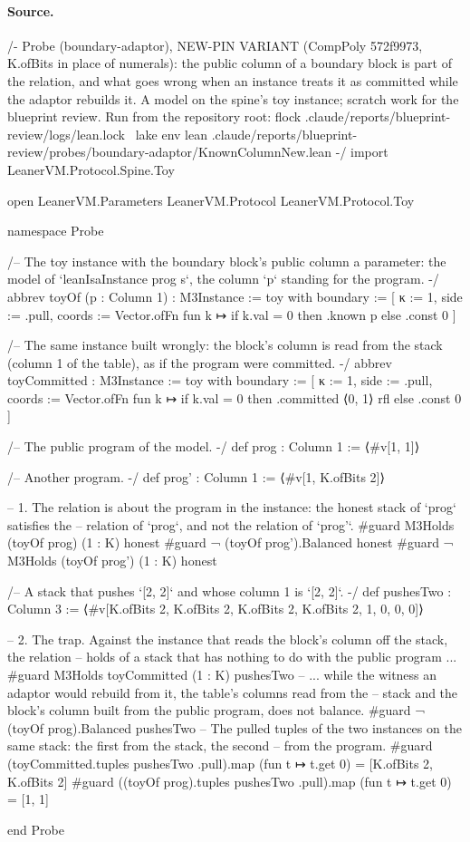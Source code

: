 \paragraph{Source.}
\begin{leancode}[numbers=left,numbersep=3pt]
/-
  Probe (boundary-adaptor), NEW-PIN VARIANT (CompPoly 572f9973, K.ofBits in place of numerals): the public column of a boundary block is part of the relation, and
  what goes wrong when an instance treats it as committed while the adaptor rebuilds it.
  A model on the spine's toy instance; scratch work for the blueprint review.
  Run from the repository root:
    flock .claude/reports/blueprint-review/logs/lean.lock \
      lake env lean .claude/reports/blueprint-review/probes/boundary-adaptor/KnownColumnNew.lean
-/
import LeanerVM.Protocol.Spine.Toy

open LeanerVM.Parameters LeanerVM.Protocol LeanerVM.Protocol.Toy

namespace Probe

/-- The toy instance with the boundary block's public column a parameter: the model of
`leanIsaInstance prog s`, the column `p` standing for the program. -/
abbrev toyOf (p : Column 1) : M3Instance :=
  { toy with
    boundary := [{ κ := 1, side := .pull,
                   coords := Vector.ofFn fun k ↦ if k.val = 0 then .known p else .const 0 }] }

/-- The same instance built wrongly: the block's column is read from the stack (column 1 of the
table), as if the program were committed. -/
abbrev toyCommitted : M3Instance :=
  { toy with
    boundary := [{ κ := 1, side := .pull,
                   coords := Vector.ofFn fun k ↦
                     if k.val = 0 then .committed ⟨0, 1⟩ rfl else .const 0 }] }

/-- The public program of the model. -/
def prog : Column 1 := ⟨#v[1, 1]⟩

/-- Another program. -/
def prog' : Column 1 := ⟨#v[1, K.ofBits 2]⟩

-- 1. The relation is about the program in the instance: the honest stack of `prog` satisfies the
-- relation of `prog`, and not the relation of `prog'`.
#guard M3Holds (toyOf prog) (1 : K) honest
#guard ¬ (toyOf prog').Balanced honest
#guard ¬ M3Holds (toyOf prog') (1 : K) honest

/-- A stack that pushes `[2, 2]` and whose column 1 is `[2, 2]`. -/
def pushesTwo : Column 3 := ⟨#v[K.ofBits 2, K.ofBits 2, K.ofBits 2, K.ofBits 2, 1, 0, 0, 0]⟩

-- 2. The trap. Against the instance that reads the block's column off the stack, the relation
-- holds of a stack that has nothing to do with the public program ...
#guard M3Holds toyCommitted (1 : K) pushesTwo
-- ... while the witness an adaptor would rebuild from it, the table's columns read from the
-- stack and the block's column built from the public program, does not balance.
#guard ¬ (toyOf prog).Balanced pushesTwo
-- The pulled tuples of the two instances on the same stack: the first from the stack, the second
-- from the program.
#guard (toyCommitted.tuples pushesTwo .pull).map (fun t ↦ t.get 0) = [K.ofBits 2, K.ofBits 2]
#guard ((toyOf prog).tuples pushesTwo .pull).map (fun t ↦ t.get 0) = [1, 1]

end Probe
\end{leancode}
